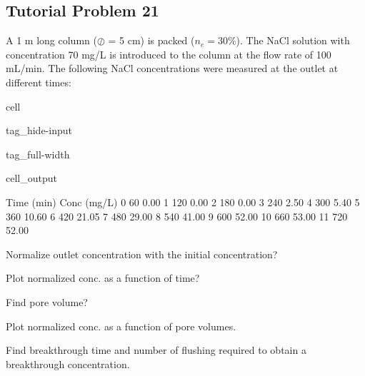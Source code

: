 \documentclass[letterpaper,10pt,english]{jupyterBook}
\begin{document}
\subsection{Tutorial Problem 21}
\label{\detokenize{content/tutorials/T8/tutorial_08:tutorial-problem-21}}
\sphinxAtStartPar
A 1 m long column (\(\oslash\) = 5 cm) is packed (\(n_e= 30\%\)). The NaCl solution with concentration 70 mg/L is introduced to the column at the flow rate of 100 mL/min. The following NaCl concentrations were measured at the outlet at different times:

\begin{sphinxuseclass}{cell}
\begin{sphinxuseclass}{tag_hide-input}
\begin{sphinxuseclass}{tag_full-width}\begin{sphinxVerbatimOutput}

\begin{sphinxuseclass}{cell_output}
\begin{sphinxVerbatim}[commandchars=\\\{\}]
    Time (min)  Conc (mg/L)
0           60         0.00
1          120         0.00
2          180         0.00
3          240         2.50
4          300         5.40
5          360        10.60
6          420        21.05
7          480        29.00
8          540        41.00
9          600        52.00
10         660        53.00
11         720        52.00
\end{sphinxVerbatim}

\end{sphinxuseclass}\end{sphinxVerbatimOutput}

\end{sphinxuseclass}
\end{sphinxuseclass}
\end{sphinxuseclass}
\sphinxAtStartPar
{}

\sphinxAtStartPar
{} Normalize outlet concentration with the initial concentration?

\sphinxAtStartPar
{} Plot normalized conc. as a function of time?

\sphinxAtStartPar
{} Find pore volume?

\sphinxAtStartPar
{} Plot normalized conc. as a function of pore volumes.

\sphinxAtStartPar
{} Find breakthrough time and number of flushing required to obtain a breakthrough concentration.
\end{document}
